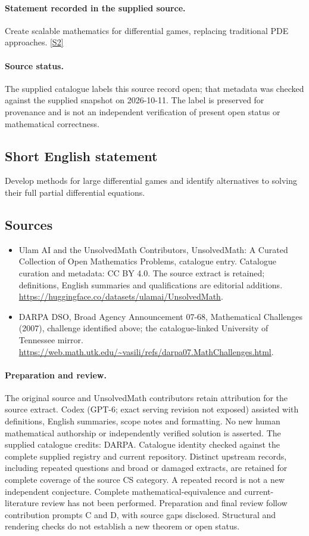 \documentclass[11pt]{article}
\begin{document}
\paragraph{Statement recorded in the supplied source.}
Create scalable mathematics for differential games, replacing traditional PDE approaches. \href{https://web.math.utk.edu/~vasili/refs/darpa07.MathChallenges.html}{[S2]}
\paragraph{Source status.}
The supplied catalogue labels this source record open; that metadata was checked against the supplied snapshot on 2026-10-11. The label is preserved for provenance and is not an independent verification of present open status or mathematical correctness.
\subsection{Short English statement}
Develop methods for large differential games and identify alternatives to solving their full partial differential equations.
\subsection{Sources}
\begin{itemize}
\item[S1] Ulam AI and the UnsolvedMath Contributors, UnsolvedMath: A Curated Collection of Open Mathematics Problems, catalogue entry. Catalogue curation and metadata: CC BY 4.0. The source extract is retained; definitions, English summaries and qualifications are editorial additions.
\url{https://huggingface.co/datasets/ulamai/UnsolvedMath}.
\item[S2] DARPA DSO, Broad Agency Announcement 07-68, Mathematical Challenges (2007), challenge identified above; the catalogue-linked University of Tennessee mirror.
\url{https://web.math.utk.edu/~vasili/refs/darpa07.MathChallenges.html}.
\end{itemize}
\paragraph{Preparation and review.}
The original source and UnsolvedMath contributors retain attribution for the source extract. Codex (GPT-6; exact serving revision not exposed) assisted with definitions, English summaries, scope notes and formatting. No new human mathematical authorship or independently verified solution is asserted. The supplied catalogue credits: DARPA. Catalogue identity checked against the complete supplied registry and current repository. Distinct upstream records, including repeated questions and broad or damaged extracts, are retained for complete coverage of the source CS category. A repeated record is not a new independent conjecture. Complete mathematical-equivalence and current-literature review has not been performed. Preparation and final review follow contribution prompts C and D, with source gaps disclosed. Structural and rendering checks do not establish a new theorem or open status.
\label{end:statement}
\end{document}
